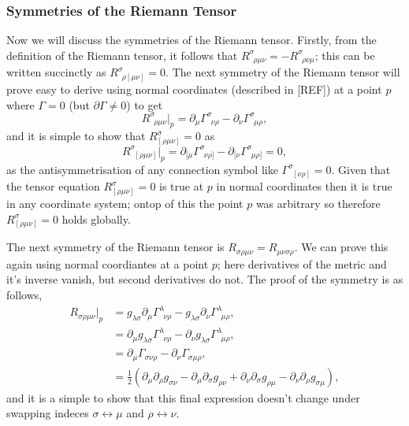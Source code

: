 \subsubsection{Symmetries of the Riemann Tensor}
Now we will discuss the symmetries of the Riemann tensor. Firstly, from the definition of the Riemann tensor, it follows that $R^\sigma_{\,\,\,\rho \mu\nu} = -R^\sigma_{\,\,\,\rho\nu\mu}$; this can be written succinctly as $R^\sigma_{\,\,\,\rho[\mu\nu]}=0$. The next symmetry of the Riemann tensor will prove easy to derive using normal coordinates (described in [REF]) at a point $p$ where $\Gamma=0$ (but $\partial \Gamma\neq 0$) to get
\begin{equation}
R^\sigma_{\,\,\,\rho\mu\nu}\big|_{p} = \partial_\mu \Gamma^\sigma_{\,\,\,\nu\rho}  - \partial_\nu \Gamma^\sigma_{\,\,\,\mu\rho},
\end{equation}
and it is simple to show that $R^\sigma_{[\rho\mu\nu]}=0$ as
\begin{equation}
R^\sigma_{\,\,\,[\rho\mu\nu]}\big|_{p} = \partial_{[\mu} \Gamma^\sigma_{\,\,\,\nu\rho]}  - \partial_{[\nu} \Gamma^\sigma_{\,\,\,\mu\rho]}=0,
\end{equation}
as the antisymmetrisation of any connection symbol like $\Gamma^\sigma_{\,\,\,[\nu\rho]}=0$. Given that the tensor equation $R^\sigma_{[\rho\mu\nu]}=0$ is true at $p$ in normal coordinates then it is true in any coordinate system; ontop of this the point $p$ was arbitrary so therefore $R^\sigma_{[\rho\mu\nu]}=0$ holds globally.

The next symmetry of the Riemann tensor is $R_{\sigma\rho\mu\nu} = R_{\mu\nu\sigma\rho}$. We can prove this again using normal coordiantes at a point $p$; here derivatives of the metric and it's inverse vanish, but second derivatives do not. The proof of the symmetry is as follows,
\begin{align}
R_{\sigma\rho\mu\nu}\big|_p &= g_{\lambda\sigma}\partial_\mu \Gamma^\lambda_{\,\,\,\nu\rho}  - g_{\lambda\sigma}\partial_\nu \Gamma^\lambda_{\,\,\,\mu\rho} , \\
&= \partial_\mu g_{\lambda\sigma} \Gamma^\lambda_{\,\,\,\nu\rho}  - \partial_\nu g_{\lambda\sigma} \Gamma^\lambda_{\,\,\,\mu\rho} , \\
&= \partial_\mu \Gamma_{\sigma\nu\rho}  - \partial_\nu  \Gamma_{\sigma\mu\rho} , \\
&= \frac{1}{2}\left(\partial_{\mu} \partial_\rho g_{\sigma\nu} - \partial_{\mu} \partial_\sigma g_{\rho\nu} + \partial_{\nu} \partial_\sigma g_{\rho\mu} - \partial_{\nu} \partial_\rho g_{\sigma\mu}\right),
\end{align}
and it is a simple to show that this final expression doesn't change under swapping indeces $\sigma\leftrightarrow\mu$ and $\rho\leftrightarrow\nu$.

